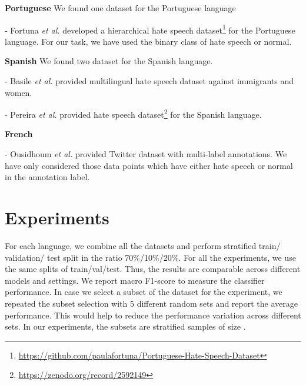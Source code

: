 \documentclass[runningheads]{llncs}
\begin{document}
\noindent\textbf{Portuguese} We found one dataset for the Portuguese language

\begin{compactenum}
    \item [-] Fortuna \textit{et al.} \cite{fortuna2019hierarchically} developed a hierarchical hate speech dataset\footnote{\url{https://github.com/paulafortuna/Portuguese-Hate-Speech-Dataset}} for the Portuguese language. For our task, we have used the binary class of hate speech or normal.

\end{compactenum}


\noindent\textbf{Spanish} We found two dataset for the Spanish language.

\begin{compactenum}
    \item [-] Basile \textit{et al.} \cite{basile2019semeval} provided multilingual hate speech dataset against immigrants and women.
    \item [-] Pereira \textit{et al.} \cite{pereira2019detecting} provided hate speech dataset\footnote{\url{https://zenodo.org/record/2592149}} for the Spanish language.
\end{compactenum}

\noindent\textbf{French}

\begin{compactenum}
    \item [-] Ousidhoum \textit{et al.} \cite{ousidhoum2019multilingual} provided Twitter dataset with multi-label annotations. We have only considered those data points which have either hate speech or normal in the annotation label.
\end{compactenum}



 


\section{Experiments}\label{sec:experiment}

For each language, we combine all the datasets and perform stratified train/ validation/ test split in the ratio 70\%/10\%/20\%. For all the experiments, we use the same splits of train/val/test. Thus, the results are comparable across different models and settings. We report macro F1-score to measure the classifier performance. In case we select a subset of the dataset for the experiment, we repeated the subset selection with 5 different random sets and report the average performance. This would help to reduce the performance variation across different sets. In our experiments, the subsets are stratified samples of size . 
\end{document}
